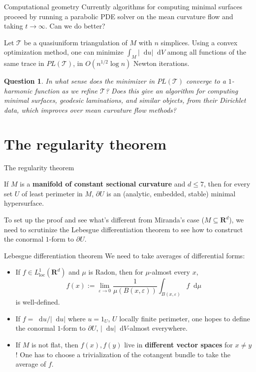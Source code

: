 \documentclass[10pt]{beamer}
\newcommand{\RR}{\mathbf{R}}
\newcommand*\dif{\mathop{}\!\mathrm{d}}
\newcommand{\loc}{\mathrm{loc}}
\newtheorem{question}{Question}
\begin{document}
\begin{frame}{Computational geometry}
Currently algorithms for computing minimal surfaces proceed by running a parabolic PDE solver on the mean curvature flow and taking $t \to \infty$.
Can we do better?

\begin{theorem}[Loisel '20]
Let $\mathcal T$ be a quasiuniform triangulation of $M$ with $n$ simplices.
Using a convex optimization method, one can minimize $\int_M |\dif u| \dif V$ among all functions of the same trace in $PL(\mathcal T)$, in $O(n^{1/2} \log n)$ Newton iterations.
\end{theorem}

\begin{question}
In what sense does the minimizer in $PL(\mathcal T)$ converge to a $1$-harmonic function as we refine $\mathcal T$?
Does this give an algorithm for computing minimal surfaces, geodesic laminations, and similar objects, from their Dirichlet data, which improves over mean curvature flow methods?
\end{question}
\end{frame}

\section{The regularity theorem}
\begin{frame}{The regularity theorem}
\begin{theorem}[--, '22]
If $M$ is a \textbf{manifold of constant sectional curvature} and $d \leq 7$, then for every set $U$ of least perimeter in $M$, $\partial U$ is an (analytic, embedded, stable) minimal hypersurface.
\end{theorem}

To set up the proof and see what's different from Miranda's case ($M \subseteq \RR^d$), we need to scrutinize the Lebesgue differentiation theorem to see how to construct the conormal $1$-form to $\partial U$.
\end{frame}

\begin{frame}{Lebesgue differentiation theorem}
We need to take averages of differential forms:
\begin{itemize}
    \item If $f \in L^1_\loc(\RR^d)$ and $\mu$ is Radon, then for $\mu$-almost every $x$,
$$f(x) := \lim_{\varepsilon \to 0} \frac{1}{\mu(B(x, \varepsilon))} \int_{B(x, \varepsilon)} f \dif \mu$$
is well-defined.
    \item If $f = \dif u/|\dif u|$ where $u = 1_U$, $U$ locally finite perimeter, one hopes to define the conormal $1$-form to $\partial U$, $|\dif u|\dif V$-almost everywhere.
    \item If $M$ is not flat, then $f(x), f(y)$ live in \textbf{different vector spaces} for $x \neq y$! One has to choose a trivialization of the cotangent bundle to take the average of $f$.
\end{itemize}
\end{frame}
\end{document}

